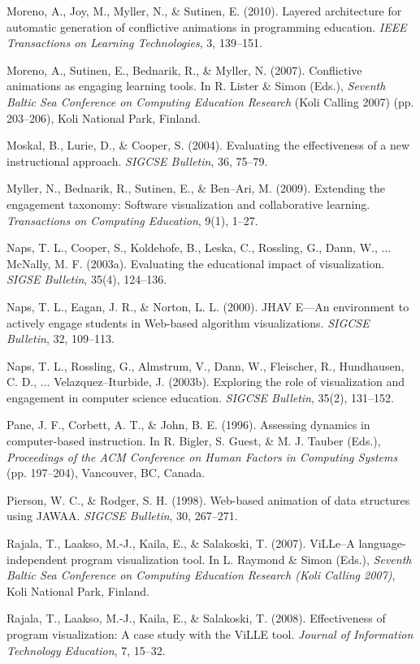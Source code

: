 \begin{chatext}
{Moreno, A., Joy, M., Myller, N., \& Sutinen, E. (2010). Layered architecture for automatic generation of conflictive animations in programming education. \textit{IEEE Transactions on Learning Technologies}, 3, 139–151.

Moreno, A., Sutinen, E., Bednarik, R., \& Myller, N. (2007). Conflictive animations as engaging learning tools. In R. Lister \& Simon (Eds.), \textit{Seventh Baltic Sea Conference on Computing Education Research} (Koli Calling 2007) (pp. 203–206), Koli National Park, Finland.

Moskal, B., Lurie, D., \& Cooper, S. (2004). Evaluating the effectiveness of a new instructional approach. \textit{SIGCSE Bulletin}, 36, 75–79.

Myller, N., Bednarik, R., Sutinen, E., \& Ben–Ari, M. (2009). Extending the engagement taxonomy: Software visualization and collaborative learning. \textit{Transactions on Computing Education}, 9(1), 1–27.

Naps, T. L., Cooper, S., Koldehofe, B., Leska, C., Rossling, G., Dann, W., ... McNally, M. F. (2003a). Evaluating the educational impact of visualization. \textit{SIGSE Bulletin}, 35(4), 124–136.

Naps, T. L., Eagan, J. R., \& Norton, L. L. (2000). JHAV E—An environment to actively engage students in Web-based algorithm visualizations. \textit{SIGCSE Bulletin}, 32, 109–113.

Naps, T. L., Rossling, G., Almstrum, V., Dann, W., Fleischer, R., Hundhausen, C. D., ... Velazquez–Iturbide, J. (2003b). Exploring the role of visualization and engagement in computer science education. \textit{SIGCSE Bulletin}, 35(2), 131–152.

Pane, J. F., Corbett, A. T., \& John, B. E. (1996). Assessing dynamics in computer-based instruction. In R. Bigler, S. Guest, \& M. J. Tauber (Eds.), \textit{Proceedings of the ACM Conference on Human Factors in Computing Systems} (pp. 197–204), Vancouver, BC, Canada.

Pierson, W. C., \& Rodger, S. H. (1998). Web-based animation of data structures using JAWAA. \textit{SIGCSE Bulletin}, 30, 267–271.

Rajala, T., Laakso, M.-J., Kaila, E., \& Salakoski, T. (2007). ViLLe–A language-independent program visualization tool. In L. Raymond \& Simon (Eds.), \textit{Seventh Baltic Sea Conference on Computing Education Research (Koli Calling 2007)}, Koli National Park, Finland.

Rajala, T., Laakso, M.-J., Kaila, E., \& Salakoski, T. (2008). Effectiveness of program visualization: A case study with the ViLLE tool. \textit{Journal of Information Technology Education}, 7, 15–32.

}
\end{chatext}
